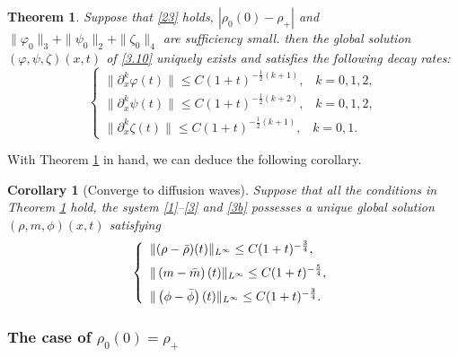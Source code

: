 \documentclass[11pt]{article}
\theoremstyle{plain}
\newtheorem{theorem}{Theorem}[section]
\newtheorem{corollary}{Corollary}[section]
\numberwithin{equation}{section}
\begin{document}
	\begin{theorem}\label{thm2}
		Suppose that \eqref{23} holds, $\left|\rho_0(0) - \rho_+\right|$ and $\|\varphi_{0}\|_{3}+\|\psi_{0}\|_{2}+\|\zeta_{0}\|_{4}$ are sufficiency small.
		then the global solution $(\varphi,\psi,\zeta)(x,t)$ of \eqref{3.10} uniquely exists and satisfies the following decay rates:
		\begin{equation}\label{3.14}
			\left\{
			\begin{array}{lr}
				\|\partial_x^k\varphi(t)\|\leq C (1+t)^{-\frac{1}{2}(k+1)},\;\;\;k=0,1,2,\\[2mm]
				\|\partial_x^k\psi(t)\|\leq C (1+t)^{-\frac{1}{2}(k+2)},\;\;\;k=0,1,2,\\[2mm]
				\|\partial_x^k\zeta(t)\|\leq C (1+t)^{-\frac{1}{2}(k+1)},\;\;\;k=0,1.
			\end{array}
			\right.
		\end{equation}
	\end{theorem}
	With Theorem \ref{thm2} in hand, we can deduce the following corollary.	
\begin{corollary}[{\rm Converge to diffusion waves}]
		Suppose that all the conditions in
		Theorem \ref{thm2} hold, the system \eqref{1}--\eqref{3} and \eqref{3b}  possesses a unique global solution $(\rho,m,\phi)(x,t)$ satisfying
		\begin{equation}\notag
			\left\{
			\begin{array}{lr}
				\|(\rho-\bar\rho)(t)\|_{L^{\infty}}\leq C (1+t)^{-\frac{3}{4}},\\[2mm]
				\|\left(m-\bar m\right)(t)\|_{L^{\infty}}\leq C (1+t)^{-\frac{5}{4}},\\[2mm]
				\|\left(\phi-\bar\phi\right)(t)\|_{L^{\infty}}\leq C (1+t)^{-\frac{3}{4}}.	
			\end{array}
			\right.
		\end{equation}
	\end{corollary}
\subsubsection{The case of $\rho_0(0)= \rho_{+}$}
\end{document}
